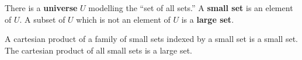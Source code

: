 There is a \textbf{universe} $U$ modelling the ``set of all sets.'' A \textbf{small set} is an element of $U$. A subset of $U$ which is not an element of $U$ is a \textbf{large set}. 

A cartesian product of a family of small sets indexed by a small set is a small set. The cartesian product of all small sets is a large set.
